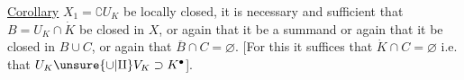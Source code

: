 \uline{Corollary}    $X_1=\complement U_K$ be locally closed, it is necessary and sufficient that $B=U_K\cap\dot K$ be    closed in $X$, or again that it be a  summand   or again that it be closed in $B\cup C$, or again that $\overline B\cap C=\varnothing$. [For this it suffices that $\dot K\cap C=\varnothing$ i.e. that $U_K\unsure{\cup|\amalg}V_K\supset K^{\bullet}$]. 
